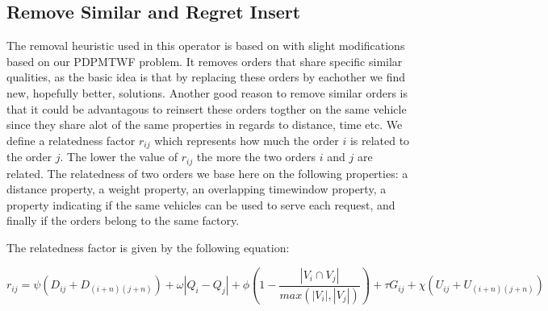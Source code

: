 \documentclass[../main.tex]{subfiles}
\begin{document}
\subsection{Remove Similar and Regret Insert}
\label{sec:shaw}
The removal heuristic used in this operator is based on \citet{shaw97} with slight modifications based on our PDPMTWF problem. 
It removes orders that share specific similar qualities, as the basic idea is that by replacing these orders by eachother we find new, hopefully better, solutions. 
Another good reason to remove similar orders is that it could be advantagous to reinsert these orders togther on the same vehicle since they share alot of the same properties in regards to distance, time etc.
We define a relatedness factor $r_{ij}$ which represents how much the order $i$ is related to the order $j$. 
The lower the value of $r_{ij}$ the more the two orders $i$ and $j$ are related.
The relatedness of two orders we base here on the following properties: 
a distance property, a weight property, an overlapping timewindow property, a property indicating if the same vehicles can be used to serve each request, and finally if the orders belong to the same factory.

The relatedness factor is given by the following equation:

\begin{equation}
\label{relatedness}
    r_{ij} = \psi ( D_{i j} + D_{(i+n)(j+n)}) + \omega|Q_i - Q_j|
    + \phi (1-\dfrac{|V_i\cap V_j|}{max(|V_i|, |V_j|)} ) + \tau G_{ij} + \chi (U_{ij} + U_{(i+n)(j+n)})
\end{equation}
\end{document}
